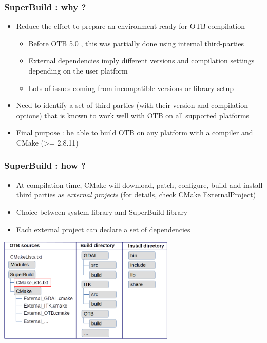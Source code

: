 \documentclass[8pt]{beamer}
\begin{document}
\begin{frame}
\frametitle{SuperBuild : why ?}

\begin{itemize}
\item Reduce the effort to prepare an environment ready for OTB compilation
\begin{itemize}
\item Before OTB 5.0 , this was partially done using internal third-parties
\item External dependencies imply different versions and compilation settings depending on the user platform
\item Lots of issues coming from incompatible versions or library setup
\end{itemize}
\item Need to identify a set of third parties (with their version and compilation options) 
that is known to work well with OTB on all supported platforms
\item Final purpose : be able to build OTB on any platform with a compiler and CMake (\textgreater = 2.8.11)
\end{itemize}

\end{frame}

\begin{frame}
\frametitle{SuperBuild : how ?}

\begin{itemize}
\item At compilation time, CMake will download, patch, configure, build and 
install third parties as \emph{external projects} (for details, check CMake 
\href{http://www.cmake.org/cmake/help/v3.2/module/ExternalProject.html}{ExternalProject})
\item Choice between system library and SuperBuild library
\item Each external project can declare a set of dependencies
\end{itemize}

\begin{center}
\includegraphics[height=5cm]{images/otb_superbuild_archi}
\end{center}

\end{frame}
\end{document}
